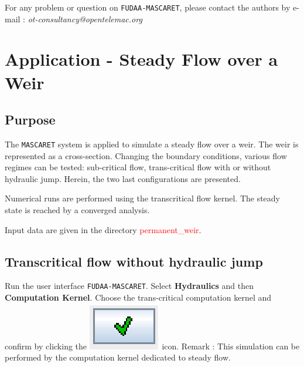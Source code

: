 \documentclass[a4paper,12pt]{article}
\begin{document}
For any problem or question on \texttt{FUDAA-MASCARET}, please contact the authors by e-mail : \emph{ot-consultancy@opentelemac.org} 

%

\section{Application - Steady Flow over a Weir  
 }


\subsection{Purpose}

\hspace{0.5cm} The \texttt{MASCARET} system is applied to simulate a steady flow over a weir. The weir is represented as a cross-section. Changing the boundary conditions,
various flow regimes can be tested: sub-critical flow, trans-critical flow with or without hydraulic jump. Herein, the two last configurations are presented.

\vspace{0.5cm}

Numerical runs are performed using the transcritical flow kernel. The steady state is reached by a converged analysis. 

\vspace{0.5cm}

Input data are given in the directory \textcolor{red}{permanent\_weir}.


\subsection{Transcritical flow without hydraulic jump}

\hspace{0.5cm} Run the user interface \texttt{FUDAA-MASCARET}. Select \textbf{Hydraulics} and then \textbf{Computation
Kernel}. Choose the trans-critical computation kernel and confirm by clicking the \includegraphics[scale=0.6]{valid}
icon.
\vspace{0.5cm}
Remark : This simulation can be performed by the computation kernel dedicated to steady flow. 
\newpage
\end{document}
